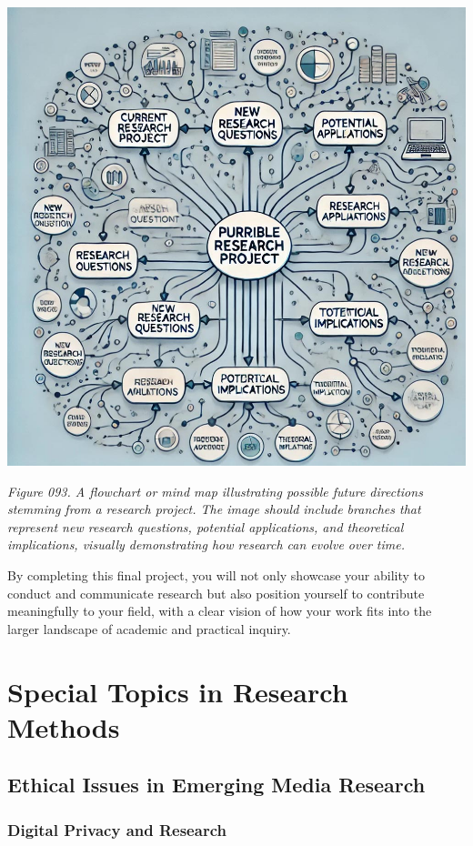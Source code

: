 \documentclass[
]{book}
\begin{document}
\includegraphics[width=1\textwidth,height=\textheight]{images/fig093.jpg}

\emph{Figure 093. A flowchart or mind map illustrating possible future directions stemming from a research project. The image should include branches that represent new research questions, potential applications, and theoretical implications, visually demonstrating how research can evolve over time.}

By completing this final project, you will not only showcase your ability to conduct and communicate research but also position yourself to contribute meaningfully to your field, with a clear vision of how your work fits into the larger landscape of academic and practical inquiry.

\chapter{Special Topics in Research Methods}\label{special-topics-in-research-methods}

\section{Ethical Issues in Emerging Media Research}\label{ethical-issues-in-emerging-media-research}

\subsection{Digital Privacy and Research}\label{digital-privacy-and-research}
\end{document}
